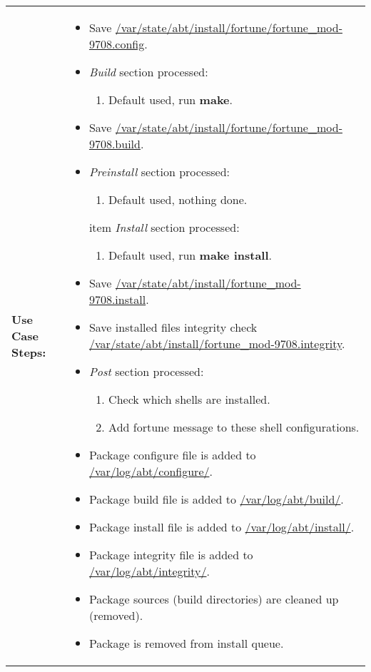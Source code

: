 \begin{tabularx}{\linewidth}{|l|X|}
\hline
\textbf{Use Case Steps:} & 
\begin{minipage}{\linewidth}
  \vspace{0.05em}
  \begin{itemize}
    \item Save \url{/var/state/abt/install/fortune/fortune_mod-9708.config}.
    \item \emph{Build} section processed:
    \begin{enumerate}
      \item Default used, run \textbf{make}.
    \end{enumerate}
    \item Save \url{/var/state/abt/install/fortune/fortune_mod-9708.build}.
    \item \emph{Preinstall} section processed:
    \begin{enumerate}
      \item Default used, nothing done.
    \end{enumerate}
    item \emph{Install} section processed:
    \begin{enumerate}
      \item Default used, run \textbf{make install}.
    \end{enumerate}
    \item Save \url{/var/state/abt/install/fortune_mod-9708.install}.
    \item Save installed files integrity check \url{/var/state/abt/install/fortune_mod-9708.integrity}.
    \item \emph{Post} section processed:
    \begin{enumerate}
      \item Check which shells are installed.
      \item Add fortune message to these shell configurations.
    \end{enumerate}
    \item Package configure file is added to \url{/var/log/abt/configure/}.
    \item Package build file is added to \url{/var/log/abt/build/}.
    \item Package install file is added to \url{/var/log/abt/install/}.
    \item Package integrity file is added to \url{/var/log/abt/integrity/}.
    \item Package sources (build directories) are cleaned up (removed).
    \item Package is removed from install queue.

\end{itemize}
\end{minipage}
\end{tabularx}
